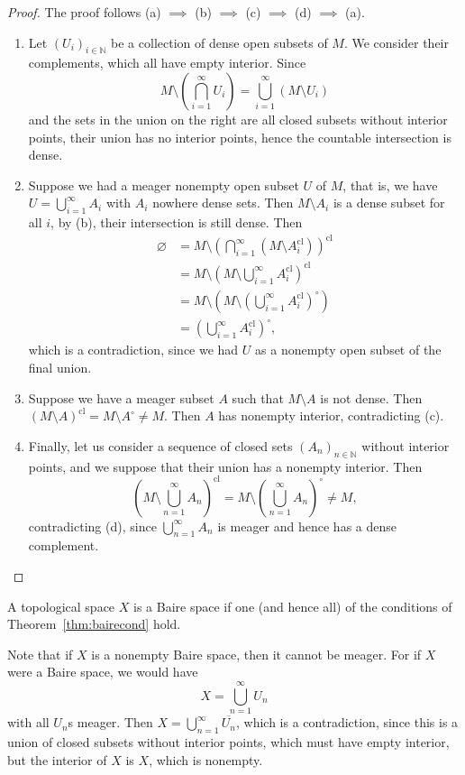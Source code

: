 \documentclass[twoside,symmetric, openany, 12pt]{./tuftebook}
\theoremstyle{definition}
\theoremstyle{definition}
\theoremstyle{definition}
\newcommand{\N}{\mathbb{N}}
\begin{document}
\begin{proof}
	The proof follows (a) $\implies$ (b) $\implies$ (c) $\implies$ (d) $\implies$ (a).
	\begin{enumerate}
		\item Let $(U_i)_{i\in \N}$ be a collection of dense open subsets of $M$. We consider their complements, which all have empty interior. Since
		\[M \setminus \left(\bigcap_{i=1}^\infty U_i\right)=\bigcup_{i=1}^\infty \left(M \setminus U_i\right)\]
		and the sets in the union on the right are all closed subsets without interior points, their union has no interior points, hence the countable intersection is dense.
		\item Suppose we had a meager nonempty open subset $U$ of $M$, that is, we have $U=\bigcup_{i=1}^\infty A_i$ with $A_i$ nowhere dense sets. Then $M \setminus A_i$ is a dense subset for all $i$, by (b), their intersection is still dense. Then
		\begin{align*}
			\varnothing &= M \setminus \left(\bigcap_{i=1}^\infty (M \setminus A_i^\text{cl})\right)^\text{cl}\\
			&= M \setminus \left(M \setminus \bigcup_{i=1}^\infty A_i^\text{cl}\right)^\text{cl}\\
			&= M \setminus \left(M \setminus\left(\bigcup_{i=1}^\infty A_i^\text{cl}\right)^\circ\right)\\
			&=\left(\bigcup_{i=1}^\infty A_i^\text{cl}\right)^\circ,
		\end{align*}
	which is a contradiction, since we had $U$ as a nonempty open subset of the final union. 
	\item Suppose we have a meager subset $A$ such that $M\setminus A$ is not dense. Then $(M \setminus A)^\text{cl} = M \setminus A^\circ \neq M$. Then $A$ has nonempty interior, contradicting (c).
	\item Finally, let us consider a sequence of closed sets $(A_n)_{n\in \N}$ without interior points, and we suppose that their union has a nonempty interior. Then
	\[\left(M \setminus \bigcup_{n=1}^\infty A_n\right)^\text{cl}=M \setminus \left(\bigcup_{n=1}^\infty A_n\right)^\circ\neq M,\]
	contradicting (d), since $\bigcup_{n=1}^\infty A_n$ is meager and hence has a dense complement.\qedhere
	\end{enumerate}
\end{proof}
	\begin{Definition}
		A topological space $X$ is a Baire space if one (and hence all) of the conditions of Theorem~\ref{thm:bairecond} hold.
	\end{Definition}
Note that if $X$ is a nonempty Baire space, then it cannot be meager. For if $X$ were a Baire space, we would have
\[X = \bigcup_{n=1}^\infty U_n\]
with all $U_n$s meager. Then $X=\bigcup_{n=1}^\infty \overline{U_n}$, which is a contradiction, since this is a union of closed subsets without interior points, which must have empty interior, but the interior of $X$ is $X$, which is nonempty.
\end{document}
